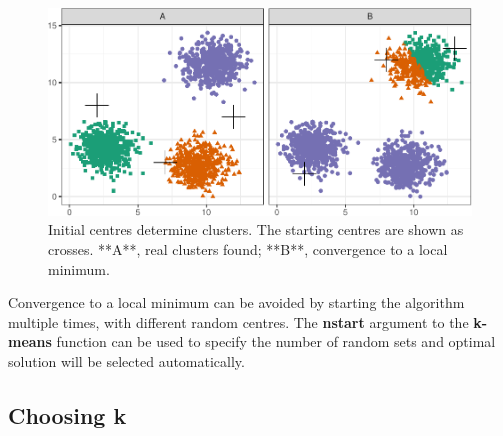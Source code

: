 \documentclass[]{book}
\theoremstyle{definition}
\theoremstyle{definition}
\theoremstyle{definition}
\theoremstyle{remark}
\begin{document}
\begin{figure}

{\centering \includegraphics[width=1\linewidth]{09-clustering_files/figure-latex/kmeansCentreChoice-1} 

}

\caption{Initial centres determine clusters. The starting centres are shown as crosses. **A**, real clusters found; **B**, convergence to a local minimum.}\label{fig:kmeansCentreChoice}
\end{figure}

Convergence to a local minimum can be avoided by starting the algorithm
multiple times, with different random centres. The \textbf{nstart}
argument to the \textbf{k-means} function can be used to specify the
number of random sets and optimal solution will be selected
automatically.

\subsection{Choosing k}\label{choosing-k}
\end{document}
